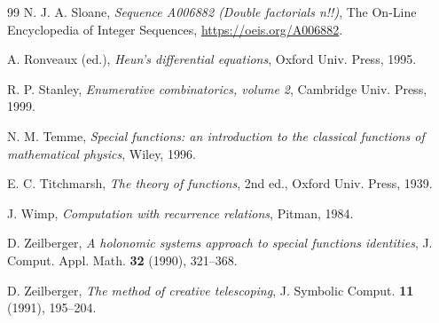 \documentclass[11pt,reqno]{amsart}
\theoremstyle{definition}
\numberwithin{equation}{section}
\begin{document}
\begin{thebibliography}{99}
N. J. A. Sloane, \emph{Sequence A006882 (Double factorials n!!)}, The On-Line Encyclopedia of Integer Sequences, \url{https://oeis.org/A006882}.

A. Ronveaux (ed.), \emph{Heun's differential equations}, Oxford Univ. Press, 1995.

R. P. Stanley, \emph{Enumerative combinatorics, volume 2}, Cambridge Univ. Press, 1999.

N. M. Temme, \emph{Special functions: an introduction to the classical functions of mathematical physics}, Wiley, 1996.

E. C. Titchmarsh, \emph{The theory of functions}, 2nd ed., Oxford Univ. Press, 1939.

J. Wimp, \emph{Computation with recurrence relations}, Pitman, 1984.

D. Zeilberger, \emph{A holonomic systems approach to special functions identities}, J. Comput. Appl. Math. \textbf{32} (1990), 321--368.

D. Zeilberger, \emph{The method of creative telescoping}, J. Symbolic Comput. \textbf{11} (1991), 195--204.

\end{thebibliography}
\end{document}
